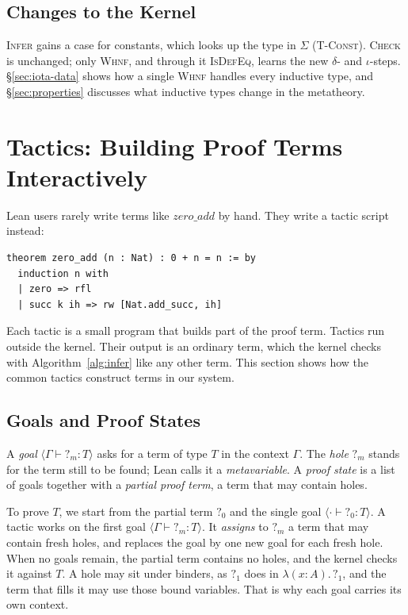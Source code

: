 \documentclass[acmsmall,screen,nonacm]{acmart}
\newcommand{\tLam}[3]{\lambda(#1{:}#2).\,#3}
\newcommand{\hole}[1]{?_{#1}}
\begin{document}
\subsection{Changes to the Kernel}

\textsc{Infer} gains a case for constants, which looks up the type in $\Sigma$ (\textsc{T-Const}).
\textsc{Check} is unchanged; only \textsc{Whnf}, and through it \textsc{IsDefEq}, learns the new $\delta$- and $\iota$-steps.
\S\ref{sec:iota-data} shows how a single \textsc{Whnf} handles every inductive type,
and \S\ref{sec:properties} discusses what inductive types change in the metatheory.


\section{Tactics: Building Proof Terms Interactively}
\label{sec:tactics}

Lean users rarely write terms like $\mathit{zero\_add}$ by hand.
They write a tactic script instead:
\begin{lstlisting}[numbers=none, columns=fullflexible, keepspaces=true]
theorem zero_add (n : Nat) : 0 + n = n := by
  induction n with
  | zero => rfl
  | succ k ih => rw [Nat.add_succ, ih]
\end{lstlisting}
Each tactic is a small program that builds part of the proof term.
Tactics run outside the kernel.
Their output is an ordinary term, which the kernel checks with Algorithm~\ref{alg:infer} like any other term.
This section shows how the common tactics construct terms in our system.

\subsection{Goals and Proof States}

A \emph{goal} $\langle \Gamma \vdash \hole{m} : T \rangle$ asks for a term of type $T$ in the context $\Gamma$.
The \emph{hole} $\hole{m}$ stands for the term still to be found; Lean calls it a \emph{metavariable}.
A \emph{proof state} is a list of goals together with a \emph{partial proof term}, a term that may contain holes.

To prove $T$, we start from the partial term $\hole{0}$ and the single goal $\langle \cdot \vdash \hole{0} : T \rangle$.
A tactic works on the first goal $\langle \Gamma \vdash \hole{m} : T \rangle$.
It \emph{assigns} to $\hole{m}$ a term that may contain fresh holes, and replaces the goal by one new goal for each fresh hole.
When no goals remain, the partial term contains no holes, and the kernel checks it against $T$.
A hole may sit under binders, as $\hole{1}$ does in $\tLam{x}{A}{\hole{1}}$, and the term that fills it may use those bound variables.
That is why each goal carries its own context.
\end{document}
